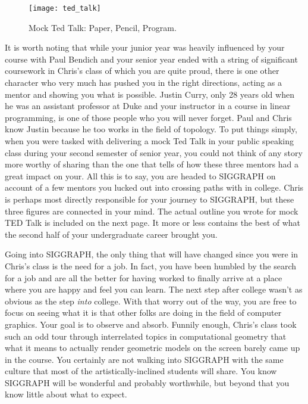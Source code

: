 \documentclass[../main.tex]{subfiles}
\begin{document}
\begin{figure}[h!]
	\centering
	\texttt{[image: ted\_talk]}
	\caption*{Mock Ted Talk: Paper, Pencil, Program.}
\end{figure}

It is worth noting that while your junior year was heavily influenced by your course with Paul Bendich and your senior year ended with a string of significant coursework in Chris's class of which you are quite proud, there is one other character who very much has pushed you in the right directions, acting as a mentor and showing you what is possible. Justin Curry, only 28 years old when he was an assistant professor at Duke and your instructor in a course in linear programming, is one of those people who you will never forget. Paul and Chris know Justin because he too works in the field of topology. To put things simply, when you were tasked with delivering a mock Ted Talk in your public speaking class during your second semester of senior year, you could not think of any story more worthy of sharing than the one that tells of how these three mentors had a great impact on your. All this is to say, you are headed to SIGGRAPH on account of a few mentors you lucked out into crossing paths with in college. Chris is perhaps most directly responsible for your journey to SIGGRAPH, but these three figures are connected in your mind. The actual outline you wrote for mock TED Talk is included on the next page. It more or less contains the best of what the second half of your undergraduate career brought you.

Going into SIGGRAPH, the only thing that will have changed since you were in Chris's class is the need for a job. In fact, you have been humbled by the search for a job and are all the better for having worked to finally arrive at a place where you are happy and feel you can learn. The next step after college wasn't as obvious as the step \textit{into} college. With that worry out of the way, you are free to focus on seeing what it is that other folks are doing in the field of computer graphics. Your goal is to observe and absorb. Funnily enough, Chris's class took such an odd tour through interrelated topics in computational geometry that what it means to actually render geometric models on the screen barely came up in the course. You certainly are not walking into SIGGRAPH with the same culture that most of the artistically-inclined students will share. You know SIGGRAPH will be wonderful and probably worthwhile, but beyond that you know little about what to expect.


\end{document}

